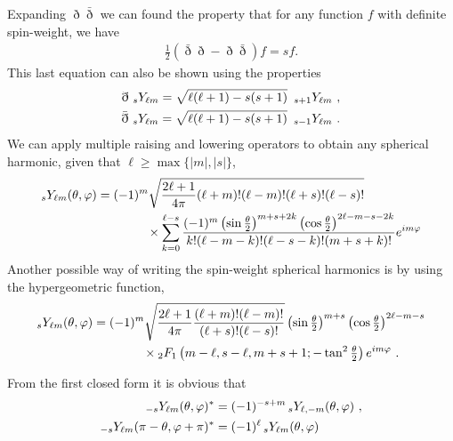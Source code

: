 Expanding $\eth \bar{\eth}$ we can found the property that for any function $f$ with definite spin-weight, we have
\begin{align}
	\frac{1}{2} (\bar\eth \eth - \eth \bar{\eth} ) f = s f .
\end{align}
This last equation can also be shown using the properties
\begin{align}
	\begin{split}
		\eth ~\uu[s]{Y}{\ell m} = \sqrt{\ell(\ell+1)-s(s+1)} ~\,\uu[s+1]{Y}{\ell m} ~, \\
		\bar\eth ~\uu[s]{Y}{\ell m} = \sqrt{\ell(\ell+1)-s(s+1)} ~\,\uu[s-1]{Y}{\ell m} ~.
	\end{split}
\end{align}
We can apply multiple raising and lowering operators to obtain any spherical harmonic, given that $\ell\ge \max\{ |m|, |s| \}$,
\begin{align}
	\begin{split}
	\uu[s]{Y}{\ell m}(\theta,\varphi) &= (-1)^m \sqrt{\frac{2\ell+1}{4 \pi} (\ell+m)! (\ell-m)! (\ell+s)! (\ell-s)!} \\
	&\qquad\qquad \times \sum_{k=0}^{\ell-s} \frac{(-1)^m \left(\sin\tfrac{\theta}{2} \right)^{m+s+2k} \left(\cos\tfrac{\theta}{2} \right)^{2\ell-m-s-2k}}{k!(\ell-m-k)!(\ell-s-k)!(m+s+k)!} e^{i m \varphi}
	\end{split}
\end{align}
Another possible way of writing the spin-weight spherical harmonics is by using the hypergeometric function,
\begin{align}
	\begin{split}
	\uu[s]{Y}{\ell m}(\theta,\varphi) &= (-1)^m \sqrt{\frac{2\ell+1}{4 \pi} \frac{(\ell+m)! (\ell-m)!}{(\ell+s)! (\ell-s)!}} \left(\sin\tfrac{\theta}{2} \right)^{m+s} \left(\cos\tfrac{\theta}{2} \right)^{2\ell-m-s} \\
	&\qquad\qquad \times \uu[2]{F}{1}\left( m-\ell, s-\ell, m+s+1; - \tan^2\tfrac{\theta}{2} \right) e^{i m \varphi} ~.
	\end{split}
\end{align}

From the first closed form it is obvious that
\begin{align}
	\begin{split}
		\uu[-s]{Y}{\ell m}(\theta,\varphi)^* &= (-1)^{-s+m} \,\uu[s]{Y}{\ell, -m}(\theta,\varphi) ~, \\
		\uu[-s]{Y}{\ell m}(\pi-\theta,\varphi+\pi)^* &= (-1)^{\ell} \,\uu[s]{Y}{\ell m}(\theta,\varphi) ~
	\end{split}	
\end{align}

